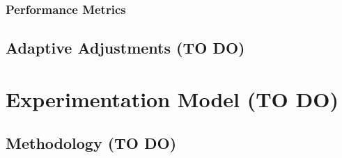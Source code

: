 \subsubsection{Performance Metrics}



\subsection{Adaptive Adjustments (TO DO)}
\label{sec:adjustments}


\section{Experimentation Model (TO DO)}


\subsection{Methodology (TO DO)}


